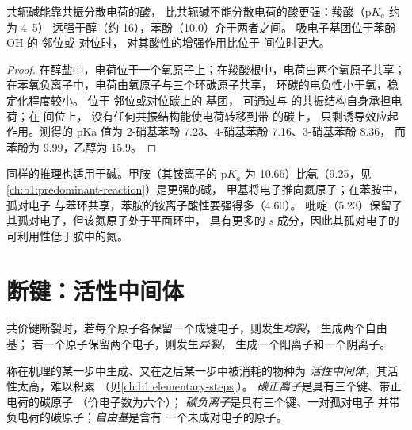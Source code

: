 \begin{proposition}[共轭效应与酸性]\label{prop:b1:electronic-effects:mesomeric-pka}
共轭碱能靠共振分散电荷的酸，
比共轭碱不能分散电荷的酸更强：羧酸（$\mathrm{p}K_a$ 约为 4--5）
远强于醇（约 16），苯酚（10.0）介于两者之间。
吸电子基团位于苯酚 OH 的 邻位或 对位时，
对其酸性的增强作用比位于 间位时更大。
\end{proposition}

\begin{proof}
在醇盐中，电荷位于一个氧原子上；在羧酸根中，电荷由两个氧原子共享；
在苯氧负离子中，电荷由氧原子与三个环碳原子共享，
环碳的电负性小于氧，稳定化程度较小。
位于 邻位或对位碳上的  基团，
可通过与  的共振结构自身承担电荷；在 间位上，
没有任何共振结构能使电荷转移到带  的碳上，
只剩诱导效应起作用。测得的 pKa 值为
2-硝基苯酚 7.23、4-硝基苯酚 7.16、3-硝基苯酚 8.36，
而苯酚为 9.99，乙醇为 15.9。
\end{proof}

同样的推理也适用于碱。甲胺（其铵离子的 $\mathrm{p}K_a$
为 10.66）比氨（9.25，见\cref{ch:b1:predominant-reaction}）是更强的碱，
甲基将电子推向氮原子；在苯胺中，孤对电子
与苯环共享，苯胺的铵离子酸性要强得多（4.60）。
吡啶（5.23）保留了其孤对电子，但该氮原子处于平面环中，
具有更多的 \textit{s} 成分，因此其孤对电子的可利用性低于胺中的氮。

\section{断键：活性中间体}

\begin{definition}[均裂与异裂]\label{def:b1:electronic-effects:cleavage}
共价键断裂时，若每个原子各保留一个成键电子，则发生\emph{均裂}，
生成两个自由基；
若一个原子保留两个电子，则发生\emph{异裂}，
生成一个阳离子和一个阴离子。
\end{definition}

\begin{definition}[活性中间体]\label{def:b1:electronic-effects:intermediates}
称在机理的某一步中生成、又在之后某一步中被消耗的物种为
\emph{活性中间体}，其活性太高，难以积累
（见\cref{ch:b1:elementary-steps}）。
\emph{碳正离子}是具有三个键、带正电荷的碳原子
（价电子数为六个）；
\emph{碳负离子}是具有三个键、一对孤对电子
并带负电荷的碳原子；\emph{自由基}是含有
一个未成对电子的原子。
\end{definition}

